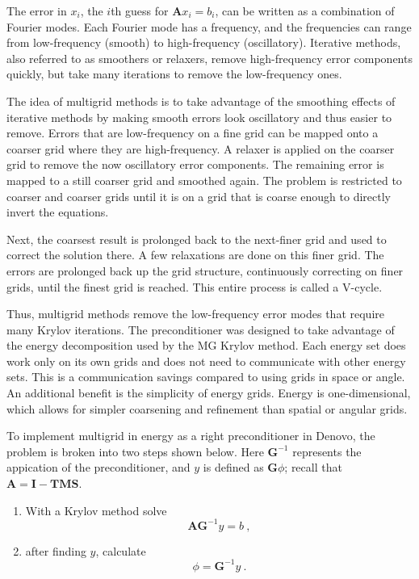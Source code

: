 \documentclass[preprint,12pt]{elsarticle}
\newcommand{\ve}[1]{\ensuremath{\mathbf{#1}}}
\begin{document}
The error in $x_i$, the $i$th guess for $\ve{A}x_i=b_i$, can be written as a combination of Fourier modes. Each Fourier mode has a frequency, and the frequencies can range from low-frequency (smooth) to high-frequency (oscillatory). Iterative methods, also referred to as smoothers or relaxers, remove high-frequency error components quickly, but take many iterations to remove the low-frequency ones. 

The idea of multigrid methods is to take advantage of the smoothing effects of iterative methods by making smooth errors look oscillatory and thus easier to remove. Errors that are low-frequency on a fine grid can be mapped onto a coarser grid where they are high-frequency. A relaxer is applied on the coarser grid to remove the now oscillatory error components. The remaining error is mapped to a still coarser grid and smoothed again. The problem is restricted to coarser and coarser grids until it is on a grid that is coarse enough to directly invert the equations.

Next, the coarsest result is prolonged back to the next-finer grid and used to correct the solution there. A few relaxations are done on this finer grid. The errors are prolonged back up the grid structure, continuously correcting on finer grids, until the finest grid is reached. This entire process is called a V-cycle. %
 
Thus, multigrid methods remove the low-frequency error modes that require many Krylov iterations. The preconditioner was designed to take advantage of the energy decomposition used by the MG Krylov method. Each energy set does work only on its own grids and does not need to communicate with other energy sets. This is a communication savings compared to using grids in space or angle. An additional benefit is the simplicity of energy grids. Energy is one-dimensional, which allows for simpler coarsening and refinement than spatial or angular grids.

To implement multigrid in energy as a right preconditioner in Denovo, the problem is broken into two steps shown below. Here $\ve{G}^{-1}$ represents the appication of the preconditioner, and $y$ is defined as $\ve{G}\phi$; recall that $\ve{A} = \ve{I} - \ve{TMS}$.  
%
\begin{enumerate}
  \item With a Krylov method solve 
    \begin{equation}
      \ve{AG}^{-1}y = b \:, \label{eq:PrecondKrylov} 
    \end{equation}
  \item after finding $y$, calculate 
    \begin{equation}
      \phi = \ve{G}^{-1}y \:. \label{eq:PrecondPhi}
    \end{equation}
\end{enumerate}
\end{document}
